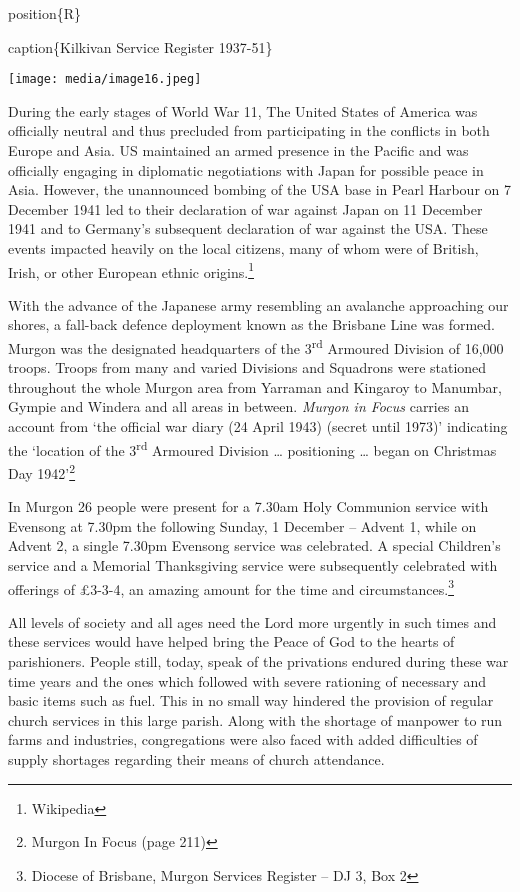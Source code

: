 position\{R\}

caption\{Kilkivan Service Register 1937-51\}

\texttt{[image: media/image16.jpeg]}

During the early stages of World War 11, The United States of America
was officially neutral and thus precluded from participating in the
conflicts in both Europe and Asia. US maintained an armed presence in
the Pacific and was officially engaging in diplomatic negotiations with
Japan for possible peace in Asia. However, the unannounced bombing of
the USA base in Pearl Harbour on 7 December 1941 led to their
declaration of war against Japan on 11 December 1941 and to Germany's
subsequent declaration of war against the USA. These events impacted
heavily on the local citizens, many of whom were of British, Irish, or
other European ethnic origins.\footnote{Wikipedia}

With the advance of the Japanese army resembling an avalanche
approaching our shores, a fall-back defence deployment known as the
Brisbane Line was formed. Murgon was the designated headquarters of the
3\textsuperscript{rd} Armoured Division of 16,000 troops. Troops from
many and varied Divisions and Squadrons were stationed throughout the
whole Murgon area from Yarraman and Kingaroy to Manumbar, Gympie and
Windera and all areas in between. \emph{Murgon in Focus} carries an
account from `the official war diary (24 April 1943) (secret until
1973)' indicating the `location of the 3\textsuperscript{rd} Armoured
Division \ldots{} positioning \ldots{} began on Christmas Day
1942'\footnote{Murgon In Focus (page 211)}

In Murgon 26 people were present for a 7.30am Holy Communion service
with Evensong at 7.30pm the following Sunday, 1 December -- Advent 1,
while on Advent 2, a single 7.30pm Evensong service was celebrated. A
special Children's service and a Memorial Thanksgiving service were
subsequently celebrated with offerings of £3-3-4, an amazing amount for
the time and circumstances.\footnote{Diocese of Brisbane, Murgon
  Services Register -- DJ 3, Box 2}

All levels of society and all ages need the Lord more urgently in such
times and these services would have helped bring the Peace of God to the
hearts of parishioners. People still, today, speak of the privations
endured during these war time years and the ones which followed with
severe rationing of necessary and basic items such as fuel. This in no
small way hindered the provision of regular church services in this
large parish. Along with the shortage of manpower to run farms and
industries, congregations were also faced with added difficulties of
supply shortages regarding their means of church attendance.

